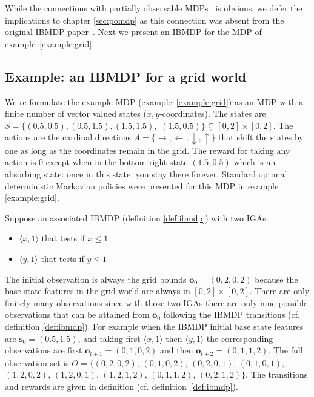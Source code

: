 While the connections with partially observable MDPs~\cite{POMDP,chap2} is obvious, we defer the implications to chapter \ref{sec:pomdp} as this connection was absent from the original IBMDP paper~\cite{topin2021iterative}.
Next we present an IBMDP for the MDP of example~\ref{example:grid}.

\subsection{Example: an IBMDP for a grid world}
We re-formulate the example MDP (example~\ref{example:grid}) as an MDP with a finite number of vector valued states ($x,y$-coordinates).
The states are $S = \{(0.5, 0.5), (0.5, 1.5), (1.5, 1.5),$ $(1.5, 0.5)\}\subsetneq [0, 2] \times [0, 2]$.
The actions are the cardinal directions $A = \{\rightarrow, \leftarrow, \downarrow, \uparrow\}$ that shift the states by one as long as the coordinates remain in the grid.
The reward for taking any action is 0 except when in the bottom right state $(1.5, 0.5)$ which is an absorbing state: once in this state, you stay there forever. 
Standard optimal deterministic Markovian policies were presented for this MDP in example \ref{example:grid}.

Suppose an associated IBMDP (definition \ref{def:ibmdp}) with two IGAs:
\begin{itemize}
    \item $\langle x, 1\rangle$ that tests if $x\leq 1$
    \item $\langle y, 1\rangle$ that tests if $y\leq 1$
\end{itemize}
The initial observation is always the grid bounds $\boldsymbol{o}_0=(0, 2, 0, 2)$ because the base state features in the grid world are always in $[0, 2] \times [0, 2]$.
There are only finitely many observations since with those two IGAs there are only nine possible observations that can be attained from $\boldsymbol{o}_0$ following the IBMDP transitions (cf. definition \ref{def:ibmdp}).
For example when the IBMDP initial base state features are $\boldsymbol{s}_0 = (0.5, 1.5)$, and taking first $\langle x, 1\rangle$ then $\langle y, 1\rangle$ the corresponding observations are first $\boldsymbol{o}_{t+1} = (0, 1, 0, 2)$ and then $\boldsymbol{o}_{t+2} = (0, 1, 1, 2)$.
The full observation set is $O = \{(0, 2, 0, 2)$, $(0, 1, 0, 2)$, $(0, 2, 0, 1)$, $(0, 1, 0, 1)$, $(1, 2, 0, 2)$, $(1, 2, 0, 1)$, $(1, 2, 1, 2)$, $(0, 1, 1, 2)$, $(0, 2, 1, 2)\}$.
The transitions and rewards are given in definition (cf. definition~\ref{def:ibmdp}).

